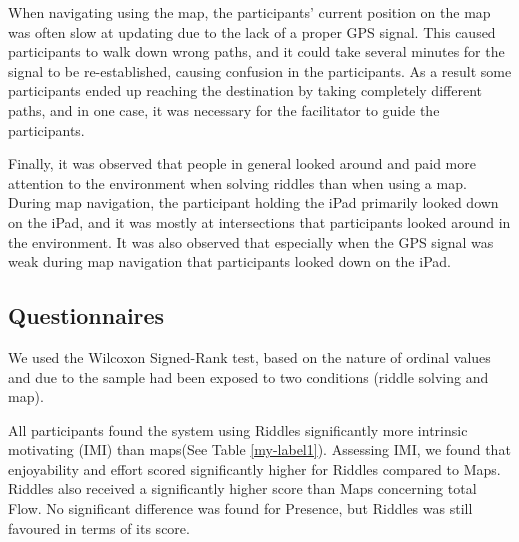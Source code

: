 
When navigating using the map, the participants' current position on the map was often slow at updating due to the lack of a proper GPS signal. This caused participants to walk down wrong paths, and it could take several minutes for the signal to be re-established, causing confusion in the participants. As a result some participants ended up reaching the destination by taking completely different paths, and in one case, it was necessary for the facilitator to guide the participants.

Finally, it was observed that people in general looked around and paid more attention to the environment when solving riddles than when using a map. During map navigation, the participant holding the iPad primarily looked down on the iPad, and it was mostly at intersections that participants looked around in the environment. It was also observed that especially when the GPS signal was weak during map navigation that participants looked down on the iPad. 	
	
\subsection{Questionnaires}
We used the Wilcoxon Signed-Rank test, based on the nature of ordinal values and due to the sample had been exposed to two conditions (riddle solving and map).

All participants found the system using Riddles significantly more intrinsic motivating (IMI) than maps(See Table \ref{my-label1}). Assessing IMI, we found that enjoyability and effort scored significantly higher for Riddles compared to Maps. Riddles also received a significantly higher score than Maps concerning total Flow. No significant difference was found for Presence, but Riddles was still favoured in terms of its score. 

